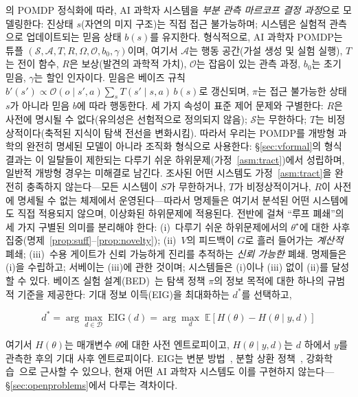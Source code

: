 \documentclass[11pt]{article}
\begin{document}
\citet{kaelbling1998pomdp}의 POMDP 정식화에 따라, AI 과학자 시스템을 \emph{부분 관측 마르코프 결정 과정}으로 모델링한다: 진상태 $s$(자연의 미지 구조)는 직접 접근 불가능하며; 시스템은 실험적 관측으로 업데이트되는 믿음 상태 $b(s)$를 유지한다. 형식적으로, AI 과학자 POMDP는 튜플 $(\mathcal{S}, \mathcal{A}, T, R, \Omega, \mathcal{O}, b_0, \gamma)$이며, 여기서 $\mathcal{A}$는 행동 공간(가설 생성 및 실험 실행), $T$는 전이 함수, $R$은 보상(발견의 과학적 가치), $\mathcal{O}$는 잡음이 있는 관측 과정, $b_0$는 초기 믿음, $\gamma$는 할인 인자이다. 믿음은 베이즈 규칙 $b'(s') \propto \mathcal{O}(o \mid s', a)\sum_{s} T(s' \mid s, a)\, b(s)$로 갱신되며, $\pi$는 접근 불가능한 상태 $s$가 아니라 믿음 $b$에 따라 행동한다. 세 가지 속성이 표준 제어 문제와 구별한다: $R$은 사전에 명시될 수 없다(유의성은 선험적으로 정의되지 않음); $\mathcal{S}$는 무한하다; $T$는 비정상적이다(축적된 지식이 탐색 전선을 변화시킴). 따라서 우리는 POMDP를 개방형 과학의 완전히 명세된 모델이 아니라 조직화 형식으로 사용한다: §\ref{sec:vformal}의 형식 결과는 이 일탈들이 제한되는 다루기 쉬운 하위문제(가정~\ref{asm:tract})에서 성립하며, 일반적 개방형 경우는 미해결로 남긴다. 조사된 어떤 시스템도 가정~\ref{asm:tract}을 완전히 충족하지 않는다---모든 시스템이 $S$가 무한하거나, $T$가 비정상적이거나, $R$이 사전에 명세될 수 없는 체제에서 운영된다---따라서 명제들은 여기서 분석된 어떤 시스템에도 직접 적용되지 않으며, 이상화된 하위문제에 적용된다. 전반에 걸쳐 ``루프 폐쇄''의 세 가지 구별된 의미를 분리해야 한다: (i)~다루기 쉬운 하위문제에서의 $\theta^\star$에 대한 사후 집중(명제~\ref{prop:suff}--\ref{prop:novelty}); (ii)~$V$의 피드백이 $G$로 흘러 들어가는 \emph{계산적} 폐쇄; (iii)~수용 게이트가 신뢰 가능하게 진리를 추적하는 \emph{신뢰 가능한} 폐쇄. 명제들은 (i)을 수립하고; 서베이는 (iii)에 관한 것이며; 시스템들은 (i)이나 (iii) 없이 (ii)를 달성할 수 있다. 베이즈 실험 설계(BED)~\citep{chaloner1995bayesian,rainforth2024modern}는 탐색 정책 $\pi$의 정보 목적에 대한 하나의 규범적 기준을 제공한다: 기대 정보 이득(EIG)을 최대화하는 $d^*$를 선택하고,

\begin{equation}
  d^* = \arg\max_{d \in \mathcal{D}}\; \mathrm{EIG}(d) = \arg\max_{d}\; \mathbb{E}\left[H(\theta) - H(\theta \mid y, d)\right]
  \label{eq:eid}
\end{equation}

여기서 $H(\theta)$는 매개변수 $\theta$에 대한 사전 엔트로피이고, $H(\theta \mid y, d)$는 $d$ 하에서 $y$를 관측한 후의 기대 사후 엔트로피이다. EIG는 변분 방법~\citep{foster2019variational}, 분할 상환 정책~\citep{foster2021dad}, 강화학습~\citep{blau2022rl}으로 근사할 수 있으나, 현재 어떤 AI 과학자 시스템도 이를 구현하지 않는다---§\ref{sec:openproblems}에서 다루는 격차이다.
\end{document}
